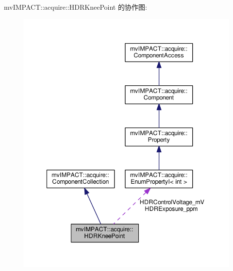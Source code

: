 mv\+I\+M\+P\+A\+C\+T\+:\+:acquire\+:\+:H\+D\+R\+Knee\+Point 的协作图\+:
\nopagebreak
\begin{figure}[H]
\begin{center}
\leavevmode
\includegraphics[width=341pt]{classmv_i_m_p_a_c_t_1_1acquire_1_1_h_d_r_knee_point__coll__graph}
\end{center}
\end{figure}
